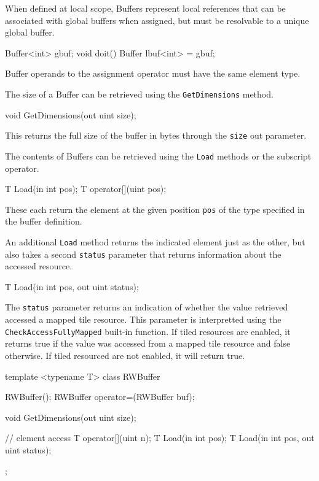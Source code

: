 When defined at local scope, Buffers represent local references
that can be associated with global buffers when assigned,
but must be resolvable to a unique global buffer.

\begin{HLSL}
  Buffer<int> gbuf;
  void doit() {
    Buffer lbuf<int> = gbuf;
  }
\end{HLSL}
Buffer operands to the assignment operator must have the same element type.


The size of a Buffer can be retrieved using the \texttt{GetDimensions} method.
\begin{HLSL}
void GetDimensions(out uint size);
\end{HLSL}

This returns the full size of the buffer in bytes through the \texttt{size} out parameter.


The contents of Buffers can be retrieved using the \texttt{Load} methods
or the subscript operator.

\begin{HLSL}
 T Load(in int pos);
 T operator[](uint pos);
\end{HLSL}

These each return the element at the given position \texttt{pos} of the type specified in the buffer definition.

An additional \texttt{Load} method returns the indicated element just as the other,
but also takes a second \texttt{status} parameter that returns information about the accessed resource.
\begin{HLSL}
 T Load(in int pos, out uint status);
\end{HLSL}

The \texttt{status} parameter returns an indication of whether the value retrieved accessed a mapped tile
resource. This parameter is interpretted using the \texttt{CheckAccessFullyMapped}
built-in function. If tiled resources are enabled, it returns true if the value was accessed from a mapped
tile resource and false otherwise. If tiled resourced are not enabled, it will return true.


\begin{HLSL}
template <typename T>
 class RWBuffer {

   RWBuffer();
   RWBuffer operator=(RWBuffer buf);

   void GetDimensions(out uint size);

   // element access
   T operator[](uint n);
   T Load(in int pos);
   T Load(in int pos, out uint status);
};
\end{HLSL}

